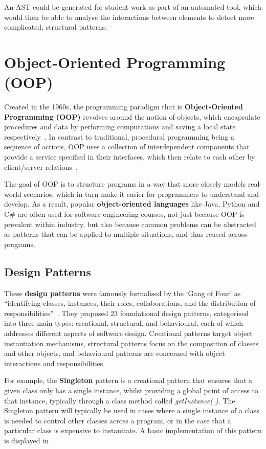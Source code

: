 An AST could be generated for student work as part of an automated tool, which would then be able to analyse the interactions between elements to detect more complicated, structural patterns.

\section{Object-Oriented Programming (OOP)} 
Created in the 1960s, the programming paradigm that is \textbf{Object-Oriented Programming (OOP)} revolves around the notion of objects, which encapsulate procedures and data by performing computations and saving a local state respectively~\cite{OOPThemes}. In contrast to traditional, procedural programming being a sequence of actions, OOP uses a collection of interdependent components that provide a service specified in their interfaces, which then relate to each other by client/server relations~\cite{OOPConcept}.

The goal of OOP is to structure programs in a way that more closely models real-world scenarios, which in turn make it easier for programmers to understand and develop. As a result, popular \textbf{object-oriented languages} like Java, Python and C\# are often used for software engineering courses, not just because OOP is prevalent within industry, but also because common problems can be abstracted as patterns that can be applied to multiple situations, and thus reused across programs.

\subsection{Design Patterns}

These \textbf{design patterns} were famously formalised by the `Gang of Four' as ``identifying classes, instances, their roles, collaborations, and the distribution of responsibilities''~\cite{GangOfFour}. They proposed 23 foundational design patterns, categorised into three main types: creational, structural, and behavioural, each of which addresses different aspects of software design. Creational patterns target object instantiation mechanisms, structural patterns focus on the composition of classes and other objects, and behavioural patterns are concerned with object interactions and responsibilities.

For example, the \textbf{Singleton} pattern is a creational pattern that ensures that a given class only has a single instance, whilst providing a global point of access to that instance, typically through a class method called \emph{getInstance( )}. The Singleton pattern will typically be used in cases where a single instance of a class is needed to control other classes across a program, or in the case that a particular class is expensive to instantiate. A basic implementation of this pattern is displayed in .

